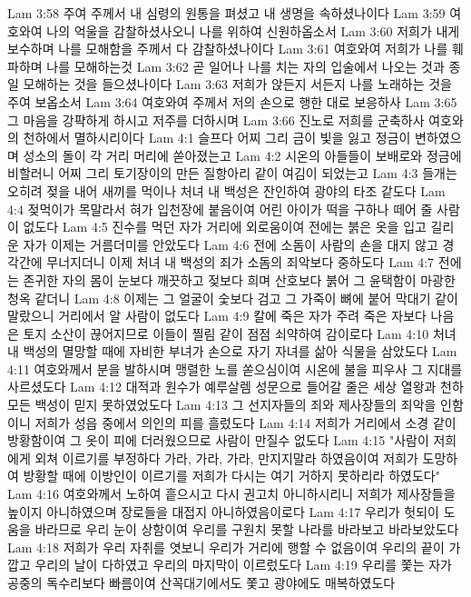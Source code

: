 Lam 3:58  주여 주께서 내 심령의 원통을 펴셨고 내 생명을 속하셨나이다
Lam 3:59  여호와여 나의 억울을 감찰하셨사오니 나를 위하여 신원하옵소서
Lam 3:60  저희가 내게 보수하며 나를 모해함을 주께서 다 감찰하셨나이다
Lam 3:61  여호와여 저희가 나를 훼파하며 나를 모해하는것
Lam 3:62  곧 일어나 나를 치는 자의 입술에서 나오는 것과 종일 모해하는 것을 들으셨나이다
Lam 3:63  저희가 앉든지 서든지 나를 노래하는 것을 주여 보옵소서
Lam 3:64  여호와여 주께서 저의 손으로 행한 대로 보응하사
Lam 3:65  그 마음을 강퍅하게 하시고 저주를 더하시며
Lam 3:66  진노로 저희를 군축하사 여호와의 천하에서 멸하시리이다
Lam 4:1  슬프다 어찌 그리 금이 빛을 잃고 정금이 변하였으며 성소의 돌이 각 거리 머리에 쏟아졌는고
Lam 4:2  시온의 아들들이 보배로와 정금에 비할러니 어찌 그리 토기장이의 만든 질항아리 같이 여김이 되었는고
Lam 4:3  들개는 오히려 젖을 내어 새끼를 먹이나 처녀 내 백성은 잔인하여 광야의 타조 같도다
Lam 4:4  젖먹이가 목말라서 혀가 입천장에 붙음이여 어린 아이가 떡을 구하나 떼어 줄 사람이 없도다
Lam 4:5  진수를 먹던 자가 거리에 외로움이여 전에는 붉은 옷을 입고 길리운 자가 이제는 거름더미를 안았도다
Lam 4:6  전에 소돔이 사람의 손을 대지 않고 경각간에 무너지더니 이제 처녀 내 백성의 죄가 소돔의 죄악보다 중하도다
Lam 4:7  전에는 존귀한 자의 몸이 눈보다 깨끗하고 젖보다 희며 산호보다 붉어 그 윤택함이 마광한 청옥 같더니
Lam 4:8  이제는 그 얼굴이 숯보다 검고 그 가죽이 뼈에 붙어 막대기 같이 말랐으니 거리에서 알 사람이 없도다
Lam 4:9  칼에 죽은 자가 주려 죽은 자보다 나음은 토지 소산이 끊어지므로 이들이 찔림 같이 점점 쇠약하여 감이로다
Lam 4:10  처녀 내 백성의 멸망할 때에 자비한 부녀가 손으로 자기 자녀를 삶아 식물을 삼았도다
Lam 4:11  여호와께서 분을 발하시며 맹렬한 노를 쏟으심이여 시온에 불을 피우사 그 지대를 사르셨도다
Lam 4:12  대적과 원수가 예루살렘 성문으로 들어갈 줄은 세상 열왕과 천하 모든 백성이 믿지 못하였었도다
Lam 4:13  그 선지자들의 죄와 제사장들의 죄악을 인함이니 저희가 성읍 중에서 의인의 피를 흘렀도다
Lam 4:14  저희가 거리에서 소경 같이 방황함이여 그 옷이 피에 더러웠으므로 사람이 만질수 없도다
Lam 4:15  "사람이 저희에게 외쳐 이르기를 부정하다 가라, 가라, 가라, 만지지말라 하였음이여 저희가 도망하여 방황할 때에 이방인이 이르기를 저희가 다시는 여기 거하지 못하리라 하였도다"
Lam 4:16  여호와께서 노하여 흩으시고 다시 권고치 아니하시리니 저희가 제사장들을 높이지 아니하였으며 장로들을 대접지 아니하였음이로다
Lam 4:17  우리가 헛되이 도움을 바라므로 우리 눈이 상함이여 우리를 구원치 못할 나라를 바라보고 바라보았도다
Lam 4:18  저희가 우리 자취를 엿보니 우리가 거리에 행할 수 없음이여 우리의 끝이 가깝고 우리의 날이 다하였고 우리의 마지막이 이르렀도다
Lam 4:19  우리를 쫓는 자가 공중의 독수리보다 빠름이여 산꼭대기에서도 쫓고 광야에도 매복하였도다
